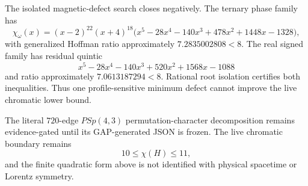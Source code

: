 The isolated magnetic-defect search closes negatively.  The ternary phase family has
\[
\chi_{\omega}(x)=(x-2)^{22}(x+4)^{18}
\bigl(x^5-28x^4-140x^3+478x^2+1448x-1328\bigr),
\]
with generalized Hoffman ratio approximately $7.2835002808<8$.  The real signed family has residual quintic
\[
x^5-28x^4-140x^3+520x^2+1568x-1088
\]
and ratio approximately $7.0613187294<8$.  Rational root isolation certifies both inequalities.  Thus one profile-sensitive minimum defect cannot improve the live chromatic lower bound.

The literal $720$-edge $PSp(4,3)$ permutation-character decomposition remains evidence-gated until its GAP-generated JSON is frozen.  The live chromatic boundary remains
\[
\boxed{10\leq\chi(H)\leq11},
\]
and the finite quadratic form above is not identified with physical spacetime or Lorentz symmetry.
